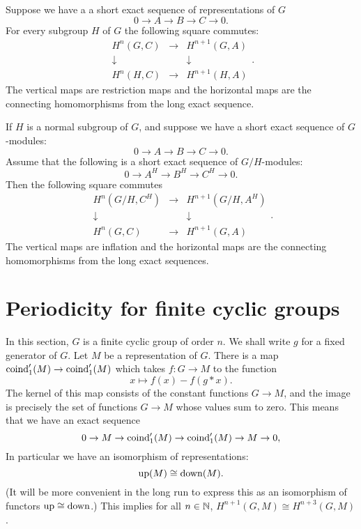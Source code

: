 \begin{lemma}
	Suppose we have a a short exact sequence of representations of $G$
	\[
			0 \to  A \to  B \to  C  \to  0.
	\]
	For every subgroup $H$ of $G$ the following square commutes:
	\[
		\begin{matrix}
			H^{n}(G,C) & \to & H^{n+1}(G,A)\\
			\downarrow & & \downarrow \\
			H^n(H,C) & \to &H^{n+1}(H,A)
		\end{matrix}.
	\]
	The vertical maps are restriction maps and the horizontal maps are the connecting homomorphisms
	from the long exact sequence.
\end{lemma}

\begin{lemma}
	If $H$ is a normal subgroup of $G$, and suppose we have a short exact
	sequence of $G$-modules:
	\[
			0 \to  A \to  B \to  C  \to  0.
	\]
	Assume that the following is a short exact sequence of $G/H$-modules:
	\[
			0 \to  A^H \to  B^H \to  C^H  \to  0.
	\]
	Then the following square commutes
	\[
		\begin{matrix}
			H^{n}(G/H,C^H) & \to & H^{n+1}(G/H,A^H)\\
			\downarrow & & \downarrow \\
			H^n(G,C) & \to & H^{n+1}(G,A)
		\end{matrix}.
	\]
	The vertical maps are inflation and the horizontal maps are the connecting homomorphisms from the long exact sequences.
\end{lemma}


\section{Periodicity for finite cyclic groups}

In this section, $G$ is a finite cyclic group of order $n$. We shall write $g$ for a fixed generator of $G$. Let $M$ be a representation of $G$.
There is a map $\mathrm{coind}_1'(M) \to \mathrm{coind}_1'(M)$ which takes $f : G \to M$ to the function
\[
	x \mapsto f(x) - f(g*x).
\]
The kernel of this map consists of the constant functions $G \to M$, and the image is precisely the
set of functions $G \to M$ whose values sum to zero.
This means that we have an exact sequence
\[
	0 \to M \to \mathrm{coind}_1'(M) \to \mathrm{coind}_1'(M) \to M \to 0,
\]
In particular we have an isomorphism of representations:
\[
	\mathrm{up}(M) \cong \mathrm{down}(M).
\]
(It will be more convenient in the long run to express this as an isomorphism of functors
$\mathrm{up} \cong \mathrm{down}$.)
This implies for all $n \in {\mathbb N}$, $H^{n+1}(G,M) \cong H^{n+3}(G,M)$.







